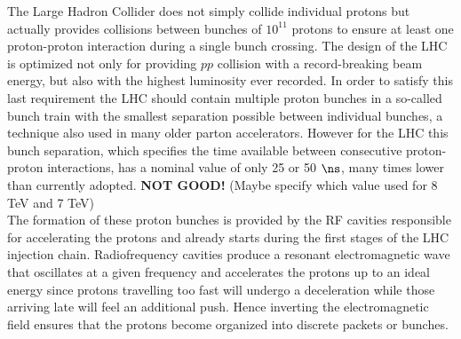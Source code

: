 The Large Hadron Collider does not simply collide individual protons but actually provides collisions between bunches of $10^{11}$ protons to ensure at least one proton-proton interaction during a single bunch crossing. The design of the LHC is optimized not only for providing $pp$ collision with a record-breaking beam energy, but also with the highest luminosity ever recorded. In order to satisfy this last requirement the LHC should contain multiple proton bunches in a so-called bunch train with the smallest separation possible between individual bunches, a technique also used in many older parton accelerators. 
However for the LHC this bunch separation, which specifies the time available between consecutive proton-proton interactions, has a nominal value of only 25 or 50 $\ns$, many times lower than currently adopted. \textbf{NOT GOOD!} (Maybe specify which value used for 8 TeV and 7 TeV)
\\
The formation of these proton bunches is provided by the RF cavities responsible for accelerating the protons and already starts during the first stages of the LHC injection chain. 
Radiofrequency cavities produce a resonant electromagnetic wave that oscillates at a given frequency and accelerates the protons up to an ideal energy since protons travelling too fast will undergo a deceleration while those arriving late will feel an additional push.
Hence inverting the electromagnetic field ensures that the protons become organized into discrete packets or bunches.
